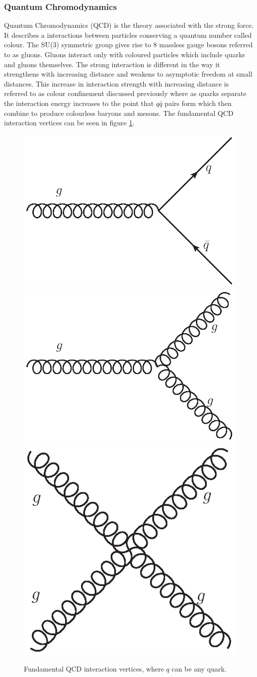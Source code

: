     \subsubsection*{Quantum Chromodynamics}
    
    Quantum Chromodynamics (QCD) is the theory associated with the strong force. It describes a interactions between particles conserving a quantum number called colour. The SU(3) symmetric group gives rise to 8 massless gauge bosons referred to as gluons. Gluons interact only with coloured particles which include quarks and gluons themselves. The strong interaction is different in the way it strengthens with increasing distance and weakens to asymptotic freedom at small distances. This increase in interaction strength with increasing distance is referred to as colour confinement discussed previously where as quarks separate the interaction energy increases to the point that $q\bar{q}$ pairs form which then combine to produce colourless baryons and mesons. The fundamental QCD interaction vertices can be seen in figure \ref{fig:QCD}.

    \begin{figure}[h]
        \begin{center}
        \includegraphics[width=0.34\linewidth]{images/g_quark.eps}
        \includegraphics[width=0.34\linewidth]{images/g_gg.eps}
        \includegraphics[width=0.25\linewidth]{images/gg_gg.eps}
        \end{center}
        \caption{Fundamental QCD interaction vertices, where $q$ can be any quark.}
        \label{fig:QCD}
    \end{figure}

